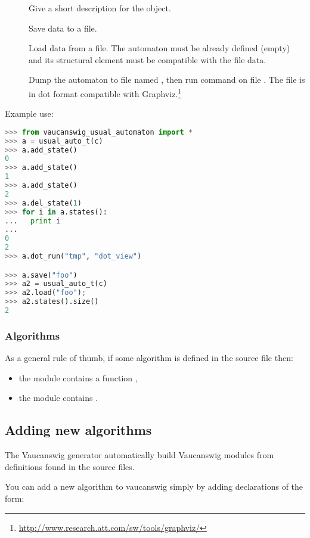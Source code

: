 \begin{description}
\item[] Give a short description for the object.
\item[] Save data to a file.
\item[] Load data from a file. The automaton must
  be already defined (empty) and its structural element must be
  compatible with the file data.
\item[] Dump the automaton to file named
  , then run command  on file . The
  file is in dot format compatible with
  Graphviz.\footnote{\url{http://www.research.att.com/sw/tools/graphviz/}}
\end{description}

Example use:

\begin{lstlisting}[language=Python]
>>> from vaucanswig_usual_automaton import *
>>> a = usual_auto_t(c)
>>> a.add_state()
0
>>> a.add_state()
1
>>> a.add_state()
2
>>> a.del_state(1)
>>> for i in a.states():
...   print i
...
0
2
>>> a.dot_run("tmp", "dot_view")

>>> a.save("foo")
>>> a2 = usual_auto_t(c)
>>> a2.load("foo");
>>> a2.states().size()
2
\end{lstlisting}


\subsubsection{Algorithms}

As a  general rule of thumb,  if some algorithm   is defined in
the source file  then:

\begin{itemize}
\item the module  contains a function
  ,
\item the module  contains
  .
\end{itemize}


\subsection{Adding new algorithms}
The Vaucanswig  generator automatically build  Vaucanswig modules from
definitions found in the \Vauc source files.

You  can  add   a  new  algorithm  to  vaucanswig   simply  by  adding
declarations of the form:

